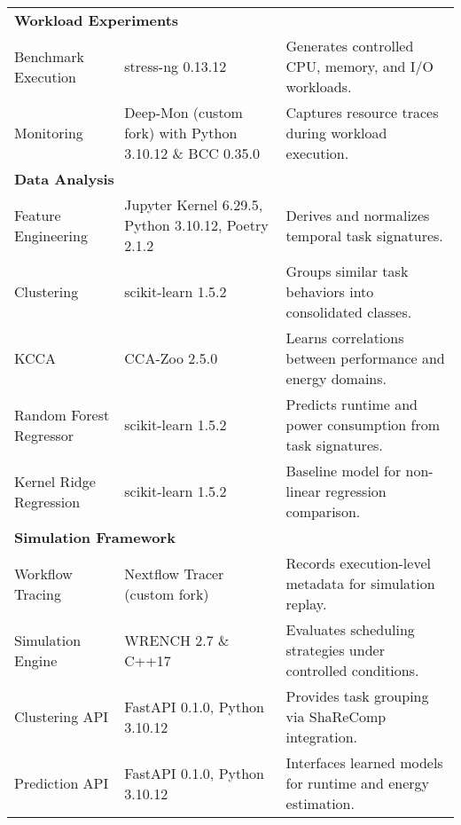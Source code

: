 \begin{table}[H]
{\begin{tabular}{
            p{4.5cm}
            >{\centering\arraybackslash}p{2.8cm}
            p{8.2cm}
            }
            \midrule
            \multicolumn{3}{l}{\textbf{Workload Experiments}}                                                                                                        \\[3pt]
            Benchmark Execution         & stress-ng 0.13.12                                        & Generates controlled CPU, memory, and I/O workloads.            \\
            Monitoring                  & Deep-Mon (custom fork) with Python 3.10.12 \& BCC 0.35.0 & Captures resource traces during workload execution.             \\

            \midrule
            \multicolumn{3}{l}{\textbf{Data Analysis}}                                                                                                               \\[3pt]
            Feature Engineering         & Jupyter Kernel 6.29.5, Python 3.10.12, Poetry 2.1.2      & Derives and normalizes temporal task signatures.                \\
            Clustering                  & scikit-learn 1.5.2                                       & Groups similar task behaviors into consolidated classes.        \\
            KCCA                        & CCA-Zoo 2.5.0                                            & Learns correlations between performance and energy domains.     \\
            Random Forest Regressor     & scikit-learn 1.5.2                                       & Predicts runtime and power consumption from task signatures.    \\
            Kernel Ridge Regression     & scikit-learn 1.5.2                                       & Baseline model for non-linear regression comparison.            \\

            \midrule
            \multicolumn{3}{l}{\textbf{Simulation Framework}}                                                                                                        \\[3pt]
            Workflow Tracing            & Nextflow Tracer (custom fork)                            & Records execution-level metadata for simulation replay.         \\
            Simulation Engine           & WRENCH 2.7 \& C++17                                      & Evaluates scheduling strategies under controlled conditions.    \\
            Clustering API              & FastAPI 0.1.0, Python 3.10.12                            & Provides task grouping via ShaReComp integration.               \\
            Prediction API              & FastAPI 0.1.0, Python 3.10.12                            & Interfaces learned models for runtime and energy estimation.    \\


\end{tabular}}
\end{table}
